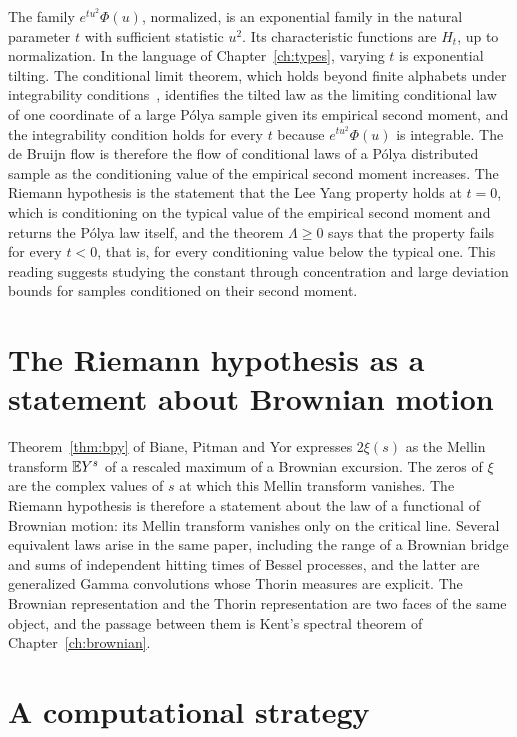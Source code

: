 The family $e^{tu^2}\Phi(u)$, normalized, is an exponential family in the natural parameter $t$ with sufficient statistic $u^2$. Its characteristic functions are $H_t$, up to normalization. In the language of Chapter~\ref{ch:types}, varying $t$ is exponential tilting. The conditional limit theorem, which holds beyond finite alphabets under integrability conditions~\cite{csiszar1984}, identifies the tilted law as the limiting conditional law of one coordinate of a large P\'olya sample given its empirical second moment, and the integrability condition holds for every $t$ because $e^{tu^2}\Phi(u)$ is integrable. The de Bruijn flow is therefore the flow of conditional laws of a P\'olya distributed sample as the conditioning value of the empirical second moment increases. The Riemann hypothesis is the statement that the Lee Yang property holds at $t = 0$, which is conditioning on the typical value of the empirical second moment and returns the P\'olya law itself, and the theorem $\Lambda\geq0$ says that the property fails for every $t<0$, that is, for every conditioning value below the typical one. This reading suggests studying the constant through concentration and large deviation bounds for samples conditioned on their second moment.

\section{The Riemann hypothesis as a statement about Brownian motion}

Theorem~\ref{thm:bpy} of Biane, Pitman and Yor expresses $2\xi(s)$ as the Mellin transform $\mathbb{E} Y^s$ of a rescaled maximum of a Brownian excursion. The zeros of $\xi$ are the complex values of $s$ at which this Mellin transform vanishes. The Riemann hypothesis is therefore a statement about the law of a functional of Brownian motion: its Mellin transform vanishes only on the critical line. Several equivalent laws arise in the same paper, including the range of a Brownian bridge and sums of independent hitting times of Bessel processes, and the latter are generalized Gamma convolutions whose Thorin measures are explicit. The Brownian representation and the Thorin representation are two faces of the same object, and the passage between them is Kent's spectral theorem of Chapter~\ref{ch:brownian}.

\section{A computational strategy}

